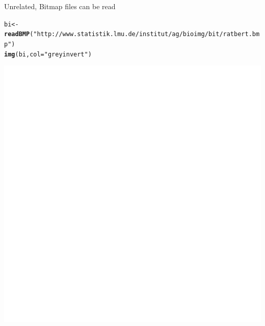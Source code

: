 \documentclass{article}\usepackage[]{graphicx}\usepackage[]{color}
\makeatletter
\def\maxwidth{ %
  \ifdim\Gin@nat@width>\linewidth
    \linewidth
  \else
    \Gin@nat@width
  \fi
}
\newcommand{\hlstr}[1]{\textcolor[rgb]{0.192,0.494,0.8}{#1}}%
\newcommand{\hlstd}[1]{\textcolor[rgb]{0.345,0.345,0.345}{#1}}%
\newcommand{\hlkwb}[1]{\textcolor[rgb]{0.69,0.353,0.396}{#1}}%
\newcommand{\hlkwc}[1]{\textcolor[rgb]{0.333,0.667,0.333}{#1}}%
\newcommand{\hlkwd}[1]{\textcolor[rgb]{0.737,0.353,0.396}{\textbf{#1}}}%
\newenvironment{kframe}{%
 \def\at@end@of@kframe{}%
 \ifinner\ifhmode%
  \def\at@end@of@kframe{\end{minipage}}%
  \begin{minipage}{\columnwidth}%
 \fi\fi%
 \def\FrameCommand##1{\hskip\@totalleftmargin \hskip-\fboxsep
 \colorbox{shadecolor}{##1}\hskip-\fboxsep
     \hskip-\linewidth \hskip-\@totalleftmargin \hskip\columnwidth}%
 \MakeFramed {\advance\hsize-\width
   \@totalleftmargin\z@ \linewidth\hsize
   \@setminipage}}%
 {\par\unskip\endMakeFramed%
 \at@end@of@kframe}
\newenvironment{knitrout}{}{} %
\makeatother
\begin{document}
Unrelated, Bitmap files can be read
\begin{knitrout}
\color{fgcolor}\begin{kframe}
\begin{alltt}
\hlstd{bi}\hlkwb{<-}\hlkwd{readBMP}\hlstd{(}\hlstr{"http://www.statistik.lmu.de/institut/ag/bioimg/bit/ratbert.bmp"}\hlstd{)}
\hlkwd{img}\hlstd{(bi,}\hlkwc{col}\hlstd{=}\hlstr{"greyinvert"}\hlstd{)}
\end{alltt}
\end{kframe}
\includegraphics[width=\maxwidth]{figure/unnamed-chunk-6-1} 

\end{knitrout}
\end{document}
